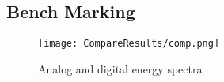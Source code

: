 \documentclass[main.tex]{subfiles}
\begin{document}
\subsection{Bench Marking}
\begin{figure}[ht]
    \centering
        \texttt{[image: CompareResults/comp.png]}
        \caption{Analog and digital energy spectra}
    \label{fig:AD_QDC}
\end{figure}
\end{document}
